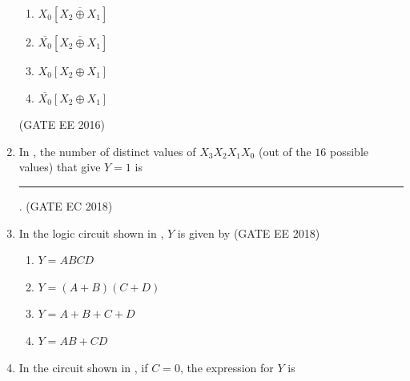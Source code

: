 \begin{enumerate}[label=\arabic*.,ref=\theenumi]
\begin{enumerate}
\item $X_0 \left[ \overline {X_2 \oplus X_1} \right]$
\item $\overline {X_0} \left[ \overline {X_2 \oplus X_1} \right]$
\item $X_0 \left[ X_2 \oplus X_1 \right]$
\item $\overline{X_0} \left[ X_2 \oplus X_1 \right]$
\end{enumerate}
\hfill(GATE EE 2016)
\begin{figure}[H]
\centering
\resizebox{0.5\columnwidth}{!}{%

	}
\caption{}
\label{EE2016_37_fig1}
\end{figure}
\item 
In
,
the number of distinct values of $X_3X_2X_1X_0$ (out of the $16$ possible values) that give $Y=1$ is \rule{1cm}{0.5pt}.
\hfill(GATE EC 2018)
\begin{figure}[H]
\centering
\resizebox{0.75\columnwidth}{!}{%

	}
	\caption{}
\label{fig:GATE-EE 2018,47}
\end{figure}
\item In the logic circuit shown in  
,
	$Y$ is given by
\hfill(GATE EE 2018)
\begin{figure}[H]
\centering
\resizebox{0.5\columnwidth}{!}{%

	}
	\caption{}
\label{fig:GATE-EE 2018,14}
\end{figure}
\begin{enumerate}
    \item $Y = ABCD$
    \item $Y = ( A + B)(C + D) $
    \item $Y = A +B +C+ D$
    \item $Y = AB+CD $
    
\end{enumerate}

\item In the circuit shown in 
,
 if $C = 0$, the expression for $Y$ is


\end{enumerate}
